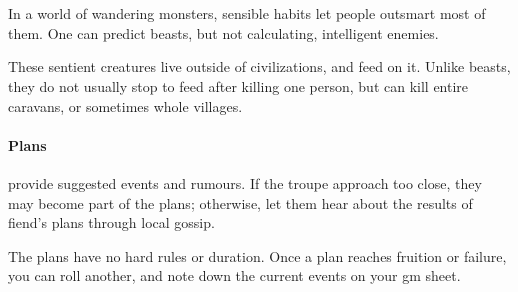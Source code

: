 \chapter[\Glsfmtplural{fiend} in the Forest]{}
\label{fiends}

\toggletrue{genExamples}

In a world of wandering monsters, sensible habits let people outsmart most of them.
One can predict beasts, but not calculating, intelligent enemies.

These sentient creatures live outside of civilizations, and feed on it.
Unlike beasts, they do not usually stop to feed after killing one person, but can kill entire caravans, or sometimes whole \glspl{village}.

\subsubsection{Plans}
provide suggested events and rumours.
If the troupe approach too close, they may become part of the plans; otherwise, let them hear about the results of \gls{fiend}'s plans through local gossip.

The plans have no hard rules or duration.
Once a plan reaches fruition or failure, you can roll another, and note down the current events on your \gls{gm} sheet.

\section{}
\label{bandit}

